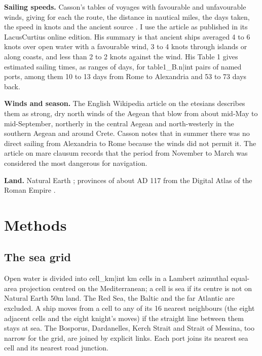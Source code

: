\documentclass[11pt,a4paper]{article}
\begin{document}
\textbf{Sailing speeds.} Casson's tables of voyages with favourable and unfavourable winds, giving for each the route, the distance in nautical miles, the days taken, the speed in knots and the ancient source \citep{casson1951}. I use the article as published in its LacusCurtius online edition. His summary is that ancient ships averaged 4 to 6 knots over open water with a favourable wind, 3 to 4 knots through islands or along coasts, and less than 2 to 2\textonehalf{} knots against the wind. His Table 1 gives estimated sailing times, as ranges of days, for {{table1_B.n|int}} pairs of named ports, among them 10 to 13 days from Rome to Alexandria and 53 to 73 days back.

\textbf{Winds and season.} The English Wikipedia article on the etesians \citep{wikietesian} describes them as strong, dry north winds of the Aegean that blow from about mid-May to mid-September, northerly in the central Aegean and north-westerly in the southern Aegean and around Crete. Casson notes that in summer there was no direct sailing from Alexandria to Rome because the winds did not permit it. The article on mare clausum \citep{wikimare} records that the period from November to March was considered the most dangerous for navigation.

\textbf{Land.} Natural Earth \citep{naturalearth}; provinces of about AD 117 from the Digital Atlas of the Roman Empire \citep{dare}.

\section{Methods}
\subsection{The sea grid}
Open water is divided into {{cell_km|int}} km cells in a Lambert azimuthal equal-area projection centred on the Mediterranean; a cell is sea if its centre is not on Natural Earth 50m land. The Red Sea, the Baltic and the far Atlantic are excluded. A ship moves from a cell to any of its 16 nearest neighbours (the eight adjacent cells and the eight knight's moves) if the straight line between them stays at sea. The Bosporus, Dardanelles, Kerch Strait and Strait of Messina, too narrow for the grid, are joined by explicit links. Each port joins its nearest sea cell and its nearest road junction.
\end{document}
